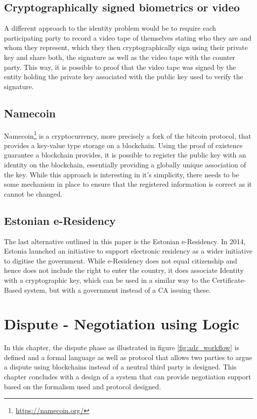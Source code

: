 \documentclass[12pt,msc,a4paper,oneside]{ucl_thesis}
\begin{document}
\section{Cryptographically signed biometrics or video}
A different approach to the identity problem would be to require each participating party to record a video tape of themselves stating who they are and whom they represent, which they then cryptographically sign using their private key and share both, the signature as well as the video tape with the counter party. This way, it is possible to proof that the video tape was signed by the entity holding the private key associated with the public key used to verify the signature.

\section{Namecoin}
Namecoin\footnote{\url{https://namecoin.org/}} is a cryptocurrency, more precisely a fork of the bitcoin protocol, that provides a key-value type storage on a blockchain. Using the proof of existence guarantee a blockchain provides, it is possible to register the public key with an identity on the blockchain, essentially providing a globally unique association of the key. While this approach is interesting in it's simplicity, there needs to be some mechanism in place to ensure that the registered information is correct as it cannot be changed.

\section{Estonian e-Residency}
The last alternative outlined in this paper is the Estonian e-Residency. In 2014, Estonia launched an initiative to support electronic residency as a wider initiative to digitise the government. While e-Residency does not equal citizenship and hence does not include the right to enter the country, it does associate Identity with a cryptographic key, which can be used in a similar way to the Certificate-Based system, but with a government instead of a CA issuing these. \cite{estonia:eResidency}

\chapter{Dispute - Negotiation using Logic} \label{chapter:dispute}
In this chapter, the dispute phase as illustrated in figure \ref{fig:adr_workflow} is defined and a formal language as well as protocol that allows two parties to argue a dispute using blockchains instead of a neutral third party is designed. This chapter concludes with a design of a system that can provide negotiation support based on the formalism used and protocol designed.  
\end{document}
